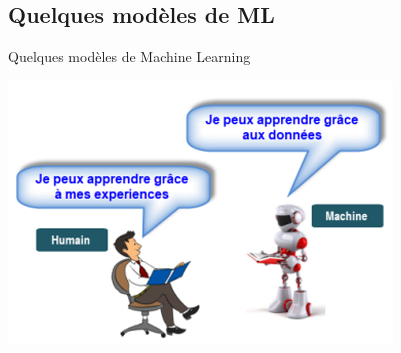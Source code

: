 \documentclass{beamer}
\begin{document}
\subsection{Quelques modèles de ML}
\begin{frame}{Quelques modèles de Machine Learning}
	\begin{center}
		\includegraphics[scale=0.8]{machineLearning.png}
	\end{center}
\end{frame}

\end{document}
